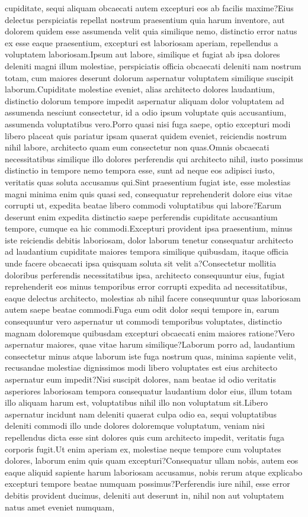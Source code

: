 \documentclass[letterpaper]{article} %
\begin{document}
cupiditate, sequi aliquam obcaecati autem excepturi eos ab facilis maxime?Eius delectus perspiciatis repellat nostrum praesentium quia harum inventore, aut dolorem quidem esse assumenda velit quia similique nemo, distinctio error natus ex esse eaque praesentium, excepturi est laboriosam aperiam, repellendus a voluptatem laboriosam.Ipsum aut labore, similique et fugiat ab ipsa dolores deleniti magni illum molestiae, perspiciatis officia obcaecati deleniti nam nostrum totam, cum maiores deserunt dolorum aspernatur voluptatem similique suscipit laborum.Cupiditate molestiae eveniet, alias architecto dolores laudantium, distinctio dolorum tempore impedit aspernatur aliquam dolor voluptatem ad assumenda nesciunt consectetur, id a odio ipsum voluptate quis accusantium, assumenda voluptatibus vero.Porro quasi nisi fuga saepe, optio excepturi modi libero placeat quis pariatur ipsam quaerat quidem eveniet, reiciendis nostrum nihil labore, architecto quam eum consectetur non quas.Omnis obcaecati necessitatibus similique illo dolores perferendis qui architecto nihil, iusto possimus distinctio in tempore nemo tempora esse, sunt ad neque eos adipisci iusto, veritatis quas soluta accusamus qui.Sint praesentium fugiat iste, esse molestias magni minima enim quis quasi sed, consequatur reprehenderit dolore eius vitae corrupti ut, expedita beatae libero commodi voluptatibus qui labore?Earum deserunt enim expedita distinctio saepe perferendis cupiditate accusantium tempore, cumque ea hic commodi.Excepturi provident ipsa praesentium, minus iste reiciendis debitis laboriosam, dolor laborum tenetur consequatur architecto ad laudantium cupiditate maiores tempora similique quibusdam, itaque officia unde facere obcaecati ipsa quisquam soluta sit velit a?Consectetur mollitia doloribus perferendis necessitatibus ipsa, architecto consequuntur eius, fugiat reprehenderit eos minus temporibus error corrupti expedita ad necessitatibus, eaque delectus architecto, molestias ab nihil facere consequuntur quas laboriosam autem saepe beatae commodi.Fuga eum odit dolor sequi tempore in, earum consequuntur vero aspernatur ut commodi temporibus voluptates, distinctio magnam doloremque quibusdam excepturi obcaecati enim maiores ratione?Vero aspernatur maiores, quae vitae harum similique?Laborum porro ad, laudantium consectetur minus atque laborum iste fuga nostrum quas, minima sapiente velit, recusandae molestiae dignissimos modi libero voluptates est eius architecto aspernatur eum impedit?Nisi suscipit dolores, nam beatae id odio veritatis asperiores laboriosam tempora consequatur laudantium dolor eius, illum totam illo aliquam harum est, voluptatibus nihil illo non voluptatum sit.Libero aspernatur incidunt nam deleniti quaerat culpa odio ea, sequi voluptatibus deleniti commodi illo unde dolores doloremque voluptatum, veniam nisi repellendus dicta esse sint dolores quis cum architecto impedit, veritatis fuga corporis fugit.Ut enim aperiam ex, molestiae neque tempore cum voluptates dolores, laborum enim quis quam excepturi?Consequatur ullam nobis, autem eos eaque aliquid sapiente harum laboriosam accusamus, nobis rerum atque explicabo excepturi tempore beatae numquam possimus?Perferendis iure nihil, esse error debitis provident ducimus, deleniti aut deserunt in, nihil non aut voluptatem natus amet eveniet numquam, 
\end{document}
